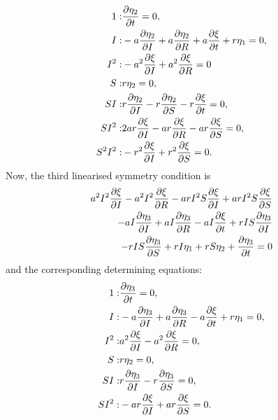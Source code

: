 \begin{align}
1:&\pdv{\eta_2}{t}=0,\\
I:&- a \pdv{\eta_2}{I} + a \pdv{\eta_2}{R} + a \pdv{\xi}{t} + r \eta_1=0,\\
I^{2}:&- a^{2} \pdv{\xi}{I} + a^{2} \pdv{\xi}{R}=0\\
S:&r \eta_2=0,\\
S I:&r \pdv{\eta_2}{I} - r \pdv{\eta_2}{S} - r \pdv{\xi}{t}=0,\\
S I^{2}:&2 a r \pdv{\xi}{I} - a r \pdv{\xi}{R} - a r \pdv{\xi}{S}=0,\\
S^{2} I^{2}:&- r^{2} \pdv{\xi}{I} + r^{2} \pdv{\xi}{S}=0.\\
\end{align}
Now, the third linearised symmetry condition is
\begin{align}
  a^{2} I^{2} \pdv{\xi}{I} - a^{2} I^{2} \pdv{\xi}{R} - a r I^{2} S \pdv{\xi}{I} + a r I^{2} S \pdv{\xi}{S}&\nonumber\\
  - a I \pdv{\eta_3}{I} + a I \pdv{\eta_3}{R} - a I \pdv{\xi}{t} + r I S \pdv{\eta_3}{I}&\nonumber\\
  - r I S \pdv{\eta_3}{S} + r I \eta_1 + r S \eta_2 + \pdv{\eta_3}{t}=0\label{eq:SIR_lin_sym_3}
\end{align}
and the corresponding determining equations:
\begin{align}
1:&\pdv{\eta_3}{t}=0,\\
I:&- a \pdv{\eta_3}{I} + a \pdv{\eta_3}{R} - a \pdv{\xi}{t} + r \eta_1=0,\\
I^{2}:&a^{2} \pdv{\xi}{I} - a^{2} \pdv{\xi}{R}=0,\\
S:&r \eta_2=0,\\
S I:&r \pdv{\eta_3}{I} - r \pdv{\eta_3}{S}=0,\\
S I^{2}:&- a r \pdv{\xi}{I} + a r \pdv{\xi}{S}=0.
\end{align}